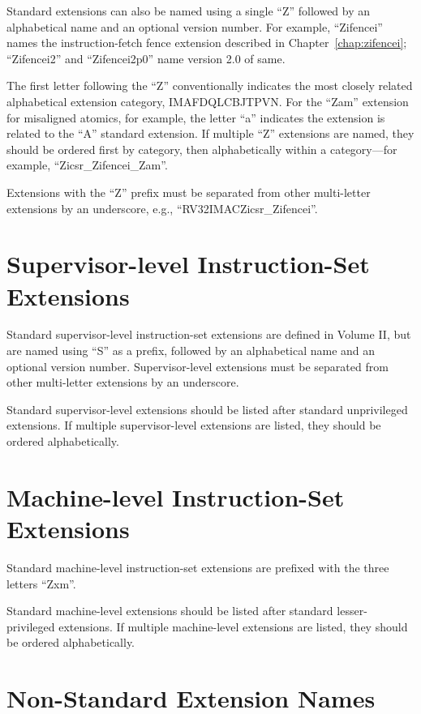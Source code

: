 Standard extensions can also be named using a single ``Z'' followed by an
alphabetical name and an optional version number.  For example,
``Zifencei'' names the instruction-fetch fence extension described in
Chapter~\ref{chap:zifencei}; ``Zifencei2'' and ``Zifencei2p0'' name version
2.0 of same.

The first letter following the ``Z'' conventionally indicates the most closely
related alphabetical extension category, IMAFDQLCBJTPVN.  For the ``Zam''
extension for misaligned atomics, for example, the letter ``a'' indicates the
extension is related to the ``A'' standard extension.  If multiple ``Z''
extensions are named, they should be ordered first by category, then
alphabetically within a category---for example, ``Zicsr\_Zifencei\_Zam''.

Extensions with the ``Z'' prefix must be separated
from other multi-letter extensions by an underscore, e.g.,
``RV32IMACZicsr\_Zifencei''.

\section{Supervisor-level Instruction-Set Extensions}

Standard supervisor-level instruction-set extensions are defined in Volume II,
but are named using ``S'' as a prefix, followed by an alphabetical name and an
optional version number.  Supervisor-level extensions must be separated from
other multi-letter extensions by an underscore.

Standard supervisor-level extensions should be listed after standard
unprivileged extensions.  If multiple supervisor-level extensions are listed,
they should be ordered alphabetically.

\section{Machine-level Instruction-Set Extensions}

Standard machine-level instruction-set extensions are prefixed with the three
letters ``Zxm''.

Standard machine-level extensions should be listed after standard
lesser-privileged extensions.  If multiple machine-level extensions are listed,
they should be ordered alphabetically.

\section{Non-Standard Extension Names}

